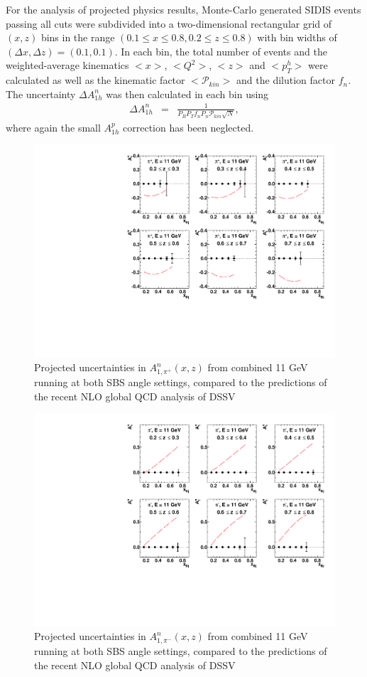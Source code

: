 For the analysis of projected physics results, Monte-Carlo generated SIDIS events passing all cuts were subdivided into a two-dimensional rectangular grid of $(x,z)$ bins in the range $(0.1 \le x \le 0.8, 0.2 \le z \le 0.8)$ with bin widths of $(\Delta x, \Delta z) = (0.1, 0.1)$. In each bin, the total number of events and the weighted-average kinematics $<x>$, $<Q^2>$, $<z>$ and $<p_T^h>$ were calculated as well as the kinematic factor $<\mathcal{P}_{kin}>$ and the dilution factor $f_n$. The uncertainty $\Delta A_{1h}^n$ was then calculated in each bin using 
\begin{eqnarray}
  \Delta A_{1h}^n &=& \frac{1}{P_BP_T f_n P_n \mathcal{P}_{kin}\sqrt{N}}\label{da1nh}, 
\end{eqnarray}
where again the small $A_{1h}^p$ correction has been neglected. 

\begin{figure}[h]
  \begin{center}
    \includegraphics[width=.75\textwidth]{figures/A1n_vs_x_E11_pip.pdf}
  \end{center}
  \caption{\label{A1n_pip_11gev} Projected uncertainties in $A_{1,\pi^+}^{n}(x,z)$ from combined 11 GeV running at both SBS angle settings, compared to the predictions of the recent NLO global QCD analysis of DSSV~\cite{DSSVplus}}
\end{figure}

\begin{figure}[h]
  \begin{center}
    \includegraphics[width=.75\textwidth]{figures/A1n_vs_x_E11_pim.pdf}
  \end{center}
  \caption{\label{A1n_pim_11gev} Projected uncertainties in $A_{1,\pi^-}^{n}(x,z)$ from combined 11 GeV running at both SBS angle settings, compared to the predictions of the recent NLO global QCD analysis of DSSV~\cite{DSSVplus}}
\end{figure}


